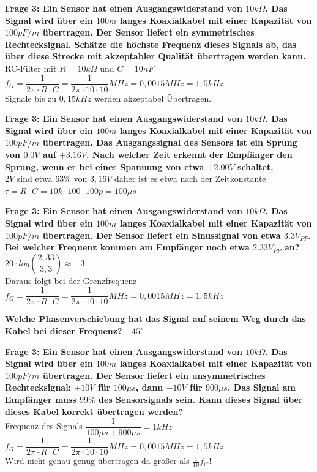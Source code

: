 \documentclass[11pt,a4paper]{scrartcl}
\begin{document}
\newpage
\textbf{Frage 3: Ein Sensor hat einen Ausgangswiderstand von $10k\Omega$. Das Signal wird über ein $100m$ langes Koaxialkabel mit einer Kapazität von $100pF/m$ übertragen. Der Sensor liefert ein symmetrisches Rechtecksignal. Schätze die höchste Frequenz dieses Signals ab, das über diese Strecke mit
akzeptabler Qualität übertragen werden kann.}\\
RC-Filter mit $R=10k\Omega$ und $C=10nF$\\
$f_{G}=\dfrac{1}{2 \pi \cdot R \cdot C}=\dfrac{1}{2\pi \cdot 10 \cdot 10}MHz=0,0015 MHz=1,5kHz$\\
Signale bis zu $0,15kHz$ werden akzeptabel Übertragen.

\textbf{Frage 3: Ein Sensor hat einen Ausgangswiderstand von $10k\Omega$. Das Signal wird über ein $100m$ langes Koaxialkabel mit einer Kapazität von $100pF/m$ übertragen. Das Ausgangssignal des Sensors ist ein Sprung von $0.0V$ auf $+3.16V$. Nach welcher Zeit erkennt der Empfänger den Sprung, wenn er bei einer Spannung von etwa $+2.00V$ schaltet.}\\
$2V$ sind etwa $63\%$ von $3,16V$ daher ist es etwa nach der Zeitkonstante $\tau =R\cdot C=10k \cdot 100 \cdot 100p=100\mu s$

\textbf{Frage 3: Ein Sensor hat einen Ausgangswiderstand von $10k\Omega$. Das Signal wird über ein $100m$ langes Koaxialkabel mit einer Kapazität von $100pF/m$ übertragen. Der Sensor liefert ein Sinussignal von etwa $3.3V_{PP}$. Bei welcher Frequenz kommen am Empfänger noch etwa $2.33V_{PP}$ an?}\\
$20 \cdot log(\dfrac{2,33}{3,3})\approx -3$ \\
Daraus folgt bei der Grenzfrequenz $f_{G}=\dfrac{1}{2 \pi \cdot R \cdot C}=\dfrac{1}{2\pi \cdot 10 \cdot 10}MHz=0,0015 MHz=1,5kHz$

\textbf{Welche Phasenverschiebung hat das Signal auf seinem Weg durch das Kabel bei dieser Frequenz?}
$-45^\circ$

\textbf{Frage 3: Ein Sensor hat einen Ausgangswiderstand von $10k\Omega$. Das Signal wird über ein $100m$ langes Koaxialkabel mit einer Kapazität von $100pF/m$ übertragen. Der Sensor liefert ein unsymmetrisches Rechtecksignal: $+10V$ für $100\mu s$, dann $-10V$ für $900\mu s$. Das Signal am Empfänger muss $99\%$ des Sensorsignals sein. Kann dieses Signal über dieses Kabel korrekt übertragen werden?}\\
Frequenz des Signals $\dfrac{1}{100\mu s + 900\mu s}=1kHz$\\
$f_{G}=\dfrac{1}{2 \pi \cdot R \cdot C}=\dfrac{1}{2\pi \cdot 10 \cdot 10}MHz=0,0015 MHz=1,5kHz$\\
Wird nicht genau genug übertragen da größer als $\frac{1}{10}f_G$!
\end{document}
